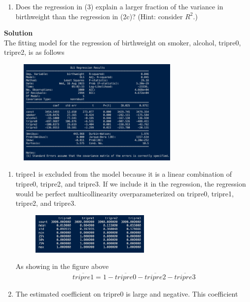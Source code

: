 \documentclass{uofa-eng-assignment}
\begin{document}
\begin{enumerate}
\begin{enumerate}
            \item Does the regression in (3) explain a larger fraction of the variance in
                  birthweight than the regression in (2c)? (Hint: consider $R^2$.)
        \end{enumerate}
        \textbf{Solution} \\
        The fitting model for the regression of birthweight on smoker, alcohol, tripre0, tripre2, is as follows
        \begin{figure}[H]
            \centering
            \includegraphics[width=0.70\textwidth]{p2-3.png}
        \end{figure}
        \begin{enumerate}
            \item tripre1 is excluded from the model because it is a linear combination of
                  tripre0, tripre2, and tripre3. If we include it in the regression, the
                  regression would be perfect multicollinearity overparameterized on tripre0,
                  tripre1, tripre2, and tripre3.
                  \begin{figure}[H]
                      \centering
                      \includegraphics[width=0.55\textwidth]{p2-3-a.png}
                  \end{figure}
                  As showing in the figure above
                  \begin{align*}
                      \overline{tripre1} = 1 - \overline{tripre0} - \overline{tripre2} - \overline{tripre3}
                  \end{align*}
            \item The estimated coefficient on tripre0 is large and negative. This coefficient

\end{enumerate}
\end{enumerate}
\end{document}
